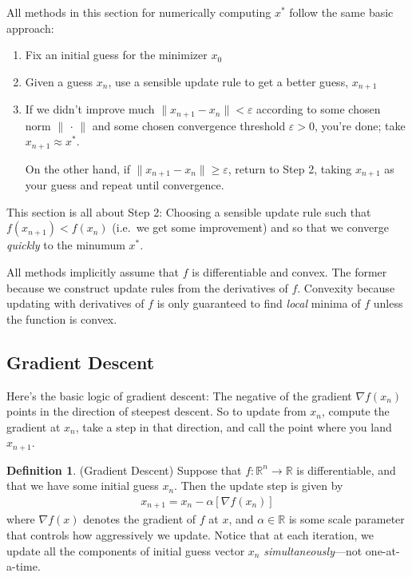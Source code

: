 \documentclass[12pt]{article}
\numberwithin{equation}{section} %
\theoremstyle{plain}
\theoremstyle{definition}
\newtheorem{defn}[thm]{Definition}
\theoremstyle{remark}
\newcommand{\ra}{\rightarrow}
\newcommand{\R}{\mathbb{R}}
\newcommand{\Rn}{\mathbb{R}^n}
\begin{document}
All methods in this section for numerically computing $x^*$ follow the
same basic approach:
\begin{enumerate}
  \item Fix an initial guess for the minimizer $x_0$
  \item Given a guess $x_n$, use a sensible update rule to get a better
    guess, $x_{n+1}$
  \item If we didn't improve much $\lVert x_{n+1}-x_n\lVert<\varepsilon$
    according to some chosen norm $\lVert\,\cdot\,\rVert$ and some
    chosen convergence threshold $\varepsilon>0$, you're done; take
    $x_{n+1}\approx x^*$.

    On the other hand, if $\lVert x_{n+1}-x_n\lVert\geq \varepsilon$,
    return to Step 2, taking $x_{n+1}$ as your guess and repeat
    until convergence.
\end{enumerate}
This section is all about Step 2: Choosing a sensible update rule
such that $f(x_{n+1}) < f(x_n)$ (i.e.\ we get some improvement) and so
that we converge \emph{quickly} to the minumum $x^*$.

All methods implicitly assume that $f$ is differentiable and convex. The
former because we construct update rules from the derivatives of $f$.
Convexity because updating with derivatives of $f$ is only guaranteed to
find \emph{local} minima of $f$ unless the function is convex.


\clearpage
\subsection{Gradient Descent}

Here's the basic logic of gradient descent: The negative of the gradient
$\nabla f(x_n)$ points in the direction of steepest descent. So to
update from $x_n$, compute the gradient at $x_n$, take a step in that
direction, and call the point where you land $x_{n+1}$.

\begin{defn}(Gradient Descent)
Suppose that $f:\Rn\ra\R$ is differentiable, and that we have some
initial guess $x_n$. Then the update step is given by
\begin{align*}
  \label{eq:multigradesc}
  x_{n+1} = x_n - \alpha [\nabla f(x_n)]
\end{align*}
where $\nabla f(x)$ denotes the gradient of $f$ at $x$, and
$\alpha\in\R$ is some scale parameter that controls how aggressively we
update.
Notice that at each iteration, we update all the components of initial
guess vector $x_n$ \emph{simultaneously}---not one-at-a-time.
\end{defn}
\end{document}
